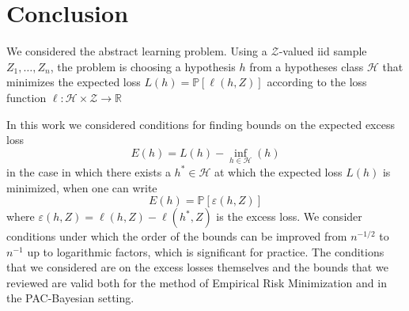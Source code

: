 \documentclass{uvamath}
\newcommand*{\reals}{\mathbb{R}}
\newcommand*{\calH}{\mathcal{H}}
\newcommand*{\calZ}{\mathcal{Z}}
\newcommand*{\bbP}{\mathbb{P}}
\newcommand*{\paren}[1]{\left(#1\right)}
\newcommand*{\rme}{\mathrm{e}}
\theoremstyle{remark}
\theoremstyle{definition}
\theoremstyle{definition}
\theoremstyle{definition}
\theoremstyle{definition}
\theoremstyle{definition}
\begin{document}



\chapter{Conclusion\label{sect:conclusion}}

We considered the abstract learning problem. Using a $\calZ$-valued
iid sample $Z_1,\dots,Z_n$, the problem is choosing a hypothesis $h$
from a hypotheses class $\calH$ that minimizes the expected loss
$L(h) = \bbP[\ell(h,Z)]$ according to the loss function
$\ell:\calH\times\calZ\to\reals$

In this work we considered conditions for finding bounds on the
expected excess loss
\begin{equation*}
  E(h) = L(h)-\inf_{h\in\calH}(h)
\end{equation*}
in the case in which there exists a $h^*\in\calH$ at which the
expected loss $L(h)$ is minimized, when one can write
\begin{equation*}
  E(h) = \bbP[\varepsilon(h,Z)]
\end{equation*}
where $\varepsilon(h,Z) = \ell(h,Z) - \ell(h^*, Z)$ is the excess
loss. We consider conditions under which the order of the bounds can
be improved from $n^{-1/2}$ to $n^{-1}$ up to logarithmic factors,
which is significant for practice. The conditions that we considered
are on the excess losses themselves and the bounds that we reviewed
are valid both for the method of Empirical Risk Minimization and in
the PAC-Bayesian setting.
\end{document}
